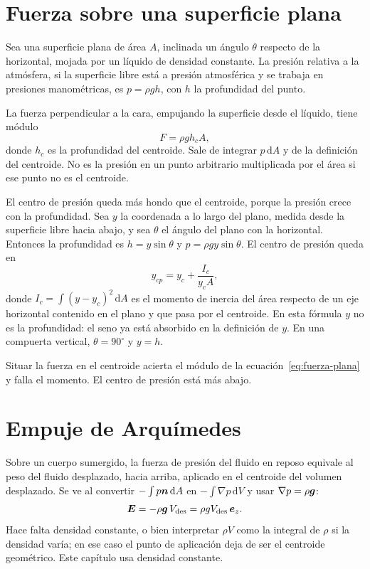 \section{Fuerza sobre una superficie plana}

Sea una superficie plana de área \(A\), inclinada un ángulo \(\theta\) respecto de la horizontal, mojada por un líquido de densidad constante. La presión relativa a la atmósfera, si la superficie libre está a presión atmosférica y se trabaja en presiones manométricas, es \(p=\rho g h\), con \(h\) la profundidad del punto.

La fuerza perpendicular a la cara, empujando la superficie desde el líquido, tiene módulo
\begin{equation}
\label{eq:fuerza-plana}
F=\rho g h_c A,
\end{equation}
donde \(h_c\) es la profundidad del centroide. Sale de integrar \(p\,\mathrm{d}A\) y de la definición del centroide. No es la presión en un punto arbitrario multiplicada por el área si ese punto no es el centroide.

El centro de presión queda más hondo que el centroide, porque la presión crece con la profundidad. Sea \(y\) la coordenada a lo largo del plano, medida desde la superficie libre hacia abajo, y sea \(\theta\) el ángulo del plano con la horizontal. Entonces la profundidad es \(h=y\sin\theta\) y \(p=\rho g y\sin\theta\). El centro de presión queda en
\begin{equation}
\label{eq:ycp}
y_{cp}=y_c+\frac{I_c}{y_c A},
\end{equation}
donde \(I_c=\int (y-y_c)^2\,\mathrm{d}A\) es el momento de inercia del área respecto de un eje horizontal contenido en el plano y que pasa por el centroide. En esta fórmula \(y\) no es la profundidad: el seno ya está absorbido en la definición de \(y\). En una compuerta vertical, \(\theta=90^{\circ}\) y \(y=h\).

\begin{errorbox}
Situar la fuerza en el centroide acierta el módulo de la ecuación~\eqref{eq:fuerza-plana} y falla el momento. El centro de presión está más abajo.
\end{errorbox}

\section{Empuje de Arquímedes}

Sobre un cuerpo sumergido, la fuerza de presión del fluido en reposo equivale al peso del fluido desplazado, hacia arriba, aplicado en el centroide del volumen desplazado. Se ve al convertir \(-\int p\boldsymbol{n}\,\mathrm{d}A\) en \(-\int\nabla p\,\mathrm{d}V\) y usar \(\nabla p=\rho\boldsymbol{g}\):
\begin{equation}
\label{eq:arquimedes}
\boldsymbol{E}=-\rho\boldsymbol{g}\,V_{\mathrm{des}}= \rho g V_{\mathrm{des}}\,\boldsymbol{e}_z.
\end{equation}
Hace falta densidad constante, o bien interpretar \(\rho V\) como la integral de \(\rho\) si la densidad varía; en ese caso el punto de aplicación deja de ser el centroide geométrico. Este capítulo usa densidad constante.

